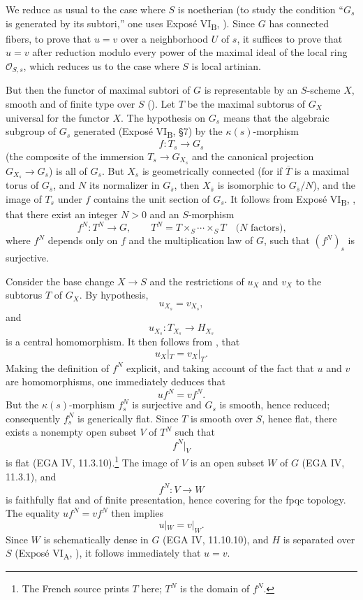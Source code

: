 \medskip
We reduce as usual to the case where \(S\) is noetherian (to study
the condition ``\(G_s\) is generated by its subtori,'' one uses
Exposé VI\textsubscript{B}, ). Since \(G\) has connected fibers,
to prove that \(u=v\) over a neighborhood \(U\) of \(s\), it
suffices to prove that \(u=v\) after reduction modulo every power
of the maximal ideal of the local ring \(\mathcal O_{S,s}\), which
reduces us to the case where \(S\) is local artinian.

But then the functor of maximal subtori of \(G\) is representable
by an \(S\)-scheme \(X\), smooth and of finite type over \(S\)
(). Let \(T\) be the maximal subtorus of \(G_X\)
universal for the functor \(X\). The hypothesis on \(G_s\) means
that the algebraic subgroup of \(G_s\) generated (Exposé
VI\textsubscript{B}, \S7) by the \(\kappa(s)\)-morphism
\[
  f:T_s\longrightarrow G_s
\]
(the composite of the immersion \(T_s\to G_{X_s}\) and the
canonical projection \(G_{X_s}\to G_s\)) is all of \(G_s\). But
\(X_s\) is geometrically connected (for if \(\overline T\) is a
maximal torus of \(G_{\bar s}\), and \(N\) its normalizer in
\(G_{\bar s}\), then \(X_{\bar s}\) is isomorphic to
\(G_{\bar s}/N\)), and the image of \(T_s\) under \(f\) contains
the unit section of \(G_s\). It follows from Exposé
VI\textsubscript{B}, , that there exist an integer \(N>0\) and
an \(S\)-morphism
\[
  f^N:T^N\longrightarrow G,
  \qquad
  T^N=T\times_S\cdots\times_S T
  \quad\text{(\(N\) factors),}
\]
where \(f^N\) depends only on \(f\) and the multiplication law of
\(G\), such that \((f^N)_s\) is surjective.

Consider the base change \(X\to S\) and the restrictions of
\(u_X\) and \(v_X\) to the subtorus \(T\) of \(G_X\). By
hypothesis,
\[
  u_{X_s}=v_{X_s},
\]
and
\[
  u_{X_s}:T_{X_s}\longrightarrow H_{X_s}
\]
is a central homomorphism. It then follows from ,
that
\[
  u_X|_T=v_X|_T.
\]
Making the definition of \(f^N\) explicit, and taking account of
the fact that \(u\) and \(v\) are homomorphisms, one immediately
deduces that
\[
  uf^N=vf^N.
\]
But the \(\kappa(s)\)-morphism \(f_s^N\) is surjective and \(G_s\)
is smooth, hence reduced; consequently \(f_s^N\) is generically
flat. Since \(T\) is smooth over \(S\), hence flat, there exists a
nonempty open subset \(V\) of \(T^N\) such that
\[
  f^N|_V
\]
is flat (EGA IV, 11.3.10).\footnote{The French source prints \(T\)
here; \(T^N\) is the domain of \(f^N\).} The image of \(V\) is an open subset
\(W\) of \(G\) (EGA IV, 11.3.1), and
\[
  f^N:V\longrightarrow W
\]
is faithfully flat and of finite presentation, hence covering for
the fpqc topology. The equality \(uf^N=vf^N\) then implies
\[
  u|_W=v|_W.
\]
Since \(W\) is schematically dense in \(G\) (EGA IV, 11.10.10),
and \(H\) is separated over \(S\) (Exposé VI\textsubscript{A},
), it follows immediately that \(u=v\).



